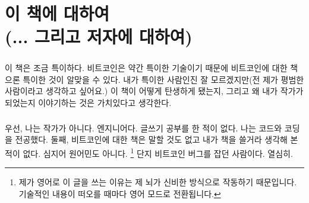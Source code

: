 
\def\bitcoinB{\leavevmode
	{\setbox0=\hbox{\textsf{B}}%
		\dimen0\ht0 \advance\dimen0 0.2ex
		\ooalign{\hfil \box0\hfil\cr
			\hfil\vrule height \dimen0 depth.2ex\hfil\cr
		}%
	}%
}

\chapter*{이 책에 대하여 \\ (... 그리고 저자에 대하여)}


\paragraph{}
이 책은 조금 특이하다. 
비트코인은 약간 특이한 기술이기 때문에 비트코인에 대한 책으론 특이한 것이 알맞을 수 있다. 
내가 특이한 사람인진 잘 모르겠지만(전 제가 평범한 사람이라고 생각하고 싶어요.) 
이 책이 어떻게 탄생하게 됐는지, 그리고 왜 내가 작가가 되었는지 이야기하는 것은 가치있다고 생각한다.


\paragraph{}
우선, 나는 작가가 아니다. 엔지니어다. 글쓰기 공부를 한 적이 없다. 나는 코드와 코딩을 전공했다. 
둘째, 비트코인에 대한 책은 말할 것도 없고 내가 책을 쓸거라 생각해 본 적이 없다. 심지어 원어민도 아니다. 
\footnote{제가 영어로 이 글을 쓰는 이유는 제 뇌가 신비한 방식으로 작동하기 때문입니다. 기술적인 내용이 떠오를 때마다 영어 모드로 전환됩니다.}
단지 비트코인 버그를 잡던 사람이다. 열심히.



